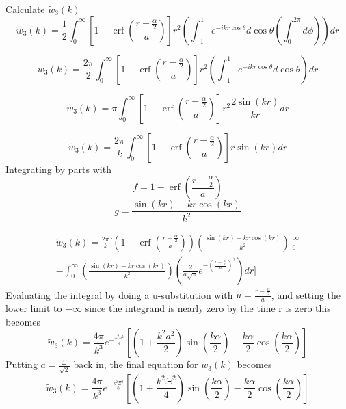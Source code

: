 \documentclass[double,12pt]{beavtex}
\begin{document}
\noindent Calculate $\widetilde{w}_3(k)$ 
\begin{equation}{\widetilde{w}_3(k)=\frac{1}{2}\int_{0}^{\infty}\left[1-\operatorname{erf}\left(\frac{r-\frac{\alpha}{2}}{a}\right)\right]r^2\left(\int_{-1}^{1}e^{-ikr\cos\theta}d{\cos\theta}\left(\int_{0}^{2\pi}d{\phi}\right)\right)d{r}}\end{equation}

\begin{equation}{\widetilde{w}_3(k)=\frac{2\pi}{2}\int_{0}^{\infty}\left[1-\operatorname{erf}\left(\frac{r-\frac{\alpha}{2}}{a}\right)\right]r^2\left(\int_{-1}^{1}e^{-ikr\cos\theta}d{\cos\theta}\right)d{r}}\end{equation}

\begin{equation}{\widetilde{w}_3(k)=\pi\int_{0}^{\infty}\left[1-\operatorname{erf}\left(\frac{r-\frac{\alpha}{2}}{a}\right)\right]r^2\frac{2\sin(kr)}{kr}d{r}}\end{equation}

\begin{equation}{\widetilde{w}_3(k)=\frac{2\pi}{k}\int_{0}^{\infty}\left[1-\operatorname{erf}\left(\frac{r-\frac{\alpha}{2}}{a}\right)\right]r\sin(kr)d{r}}\end{equation}
Integrating by parts with 
\begin{displaymath}{f=1-\operatorname{erf}\left(\frac{r-\frac{\alpha}{2}}{a}\right)}\end{displaymath}
\begin{displaymath}{g=\frac{\sin(kr)-kr\cos(kr)}{k^2}}\end{displaymath}

\begin{multline}
  \widetilde{w}_3(k)=\frac{2\pi}{k}\Bigg[\left(1-\operatorname{erf}\left(\frac{r-\frac{\alpha}{2}}{a}\right)\right)\left(\frac{\sin(kr)-kr\cos(kr)}{k^2}\right)\bigg|^{\infty}_0
   \\
  -\int_{0}^{\infty}\left(\frac{\sin(kr)-kr\cos(kr)}{k^2}\right)\left(\frac{2}{a\sqrt{\pi}}e^{-\left(\frac{r-\frac{\alpha}{2}}{a}\right)^2}\right)dr\Bigg]
\end{multline}
Evaluating the integral by doing a u-substitution with $u=\frac{r-\frac{\alpha}{2}}{a}$, 
and setting the lower limit to $-\infty$  since the integrand is 
nearly zero by the time r is zero this becomes
\begin{equation}{\widetilde{w}_3(k)=\frac{4\pi}{k^3}e^{-\frac{k^2a^2}{4}}\left[\left(1+\frac{k^2a^2}{2}\right)\sin\left(\frac{k\alpha}{2}\right)-\frac{k\alpha}{2}\cos\left(\frac{k\alpha}{2}\right)\right]}\end{equation}
Putting $a=\frac{\Xi}{\sqrt{2}}$ back in, the final equation for 
$\widetilde{w}_3(k)$ becomes
\begin{equation}{\widetilde{w}_3(k)=\frac{4\pi}{k^3}e^{-\frac{k^2\Xi^2}{8}}\left[\left(1+\frac{k^2\Xi^2}{4}\right)\sin\left(\frac{k\alpha}{2}\right)-\frac{k\alpha}{2}\cos\left(\frac{k\alpha}{2}\right)\right]}\end{equation}
\end{document}
